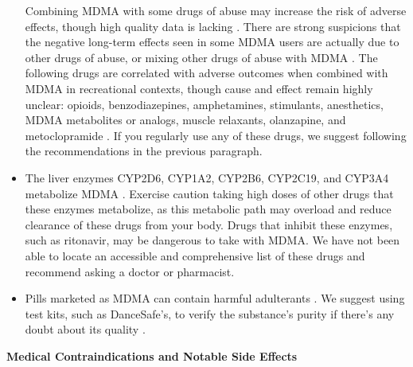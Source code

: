 \documentclass[12pt,letterpaper]{book}
\begin{document}
\begin{itemize}
    Combining MDMA with some drugs of abuse may increase the risk of adverse effects, though high quality data is lacking \cite{papaseitInteractions}. There are strong suspicions that the negative long-term effects seen in some MDMA users are actually due to other drugs of abuse, or mixing other drugs of abuse with MDMA \cite{halpernMormonRavers,passieHistory}. The following drugs are correlated with adverse outcomes when combined with MDMA in recreational contexts, though cause and effect remain highly unclear: opioids, benzodiazepines, amphetamines, stimulants, anesthetics, MDMA metabolites or analogs, muscle relaxants, olanzapine, and metoclopramide \cite{cohenMDMADrugCombinations}. If you regularly use any of these drugs, we suggest following the recommendations in the previous paragraph.
    \item The liver enzymes CYP2D6, CYP1A2, CYP2B6, CYP2C19, and CYP3A4 metabolize MDMA \cite{torreEnzymes,sarparastDrugInteractions}. Exercise caution taking high doses of other drugs that these enzymes metabolize, as this metabolic path may overload and reduce clearance of these drugs from your body. Drugs that inhibit these enzymes, such as ritonavir, may be dangerous to take with MDMA. We have not been able to locate an accessible and comprehensive list of these drugs and recommend asking a doctor or pharmacist.
    \item Pills marketed as MDMA can contain harmful adulterants \cite{saleemiAdulterants}. We suggest using test kits, such as DanceSafe's, to verify the substance's purity if there's any doubt about its quality \cite{danceSafeTestingKit}.
\end{itemize}
\noindent \textbf{Medical Contraindications and Notable Side Effects}
\end{document}
